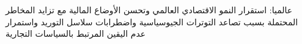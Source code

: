 عالميا: استقرار النمو الاقتصادي العالمي وتحسن الأوضاع المالية مع تزايد المخاطر المحتملة بسبب تصاعد التوترات الجيوسياسية واضطرابات سلاسل التوريد واستمرار عدم اليقين المرتبط بالسياسات التجارية
